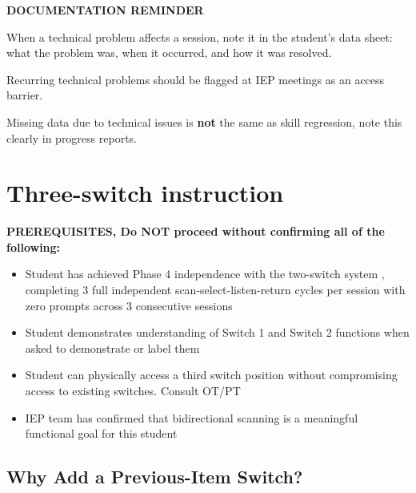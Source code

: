 \documentclass[justified,openright]{tufte-book}
\renewcommand{\chaptermark}[1]{\markboth{#1}{}}
\begin{document}
\textbf{DOCUMENTATION REMINDER}

When a technical problem affects a session, note it in the student's
data sheet: what the problem was, when it occurred, and how it was
resolved.

Recurring technical problems should be flagged at IEP meetings as an
access barrier.

Missing data due to technical issues is \textbf{not} the same as skill
regression, note this clearly in progress reports.


\chapter{Three-switch instruction}\label{section-8-three-switch-extension}
\chaptermark{Three-switch instruction}



\textbf{PREREQUISITES, Do NOT proceed without confirming all of the
following:}

\begin{itemize}

\item
  Student has achieved Phase 4 independence with the two-switch system
 , completing 3 full independent scan-select-listen-return cycles per
  session with zero prompts across 3 consecutive sessions
\item
  Student demonstrates understanding of Switch 1 and Switch 2 functions
  when asked to demonstrate or label them
\item
  Student can physically access a third switch position without
  compromising access to existing switches. Consult OT/PT
\item
  IEP team has confirmed that bidirectional scanning is a meaningful
  functional goal for this student
\end{itemize}


\section{Why Add a Previous-Item
Switch?}\label{why-add-a-previous-item-switch}

\end{document}

